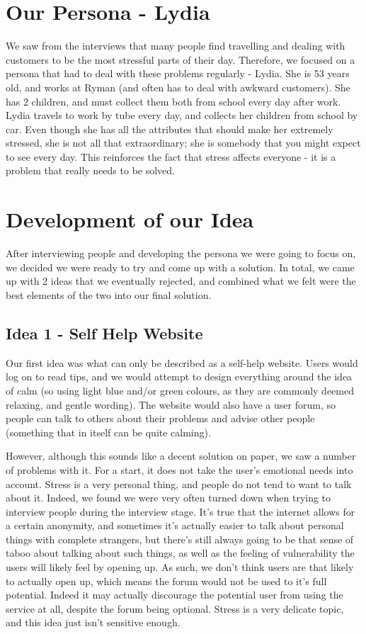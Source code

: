 \documentclass{scrartcl}
\begin{document}
\section{Our Persona - Lydia}
We saw from the interviews that many people find travelling and dealing with customers to be the most stressful parts of their day.
Therefore, we focused on a persona that had to deal with these problems regularly - Lydia. She is 53 years old, and works at Ryman
(and often has to deal with awkward customers). She has 2 children, and must collect them both from school every day after work.
Lydia travels to work by tube every day, and collects her children from school by car. Even though she has all the attributes that
should make her extremely stressed, she is not all that extraordinary; she is somebody that you might expect to see every day. This
reinforces the fact that stress affects everyone - it is a problem that really needs to be solved.

\section{Development of our Idea}
After interviewing people and developing the persona we were going to focus on, we decided we were ready to try and come up with
a solution. In total, we came up with 2 ideas that we eventually rejected, and combined what we felt were the best elements
of the two into our final solution.

\subsection{Idea 1 - Self Help Website}
Our first idea was what can only be described as a self-help website. Users would log on to read tips, and we would attempt to
design everything around the idea of calm (so using light blue and/or green colours, as they are commonly deemed relaxing,
and gentle wording). The website would also have a user forum, so people can talk to others about their problems and advise
other people (something that in itself can be quite calming).

However, although this sounds like a decent solution on paper, we saw a number of problems with it.
For a start, it does not take the user's emotional needs into account. Stress is a very personal thing, and people do not
tend to want to talk about it. Indeed, we found we were very often turned down when trying to interview people during the
interview stage. It's true that the internet allows for a certain anonymity, and sometimes it's actually easier to talk
about personal things with complete strangers, but there's still always going to be that sense of taboo about talking about
such things, as well as the feeling of vulnerability the users will likely feel by opening up. As such, we don't think users
are that likely to actually open up, which means the forum would not be used to it's full potential. Indeed it may actually
discourage the potential user from using the service at all, despite the forum being optional. Stress is a very delicate
topic, and this idea just isn't sensitive enough.
\end{document}
